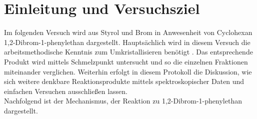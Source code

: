 \section{Einleitung und Versuchsziel}
\label{sec:aufgabenstellung}

Im folgenden Versuch wird aus Styrol und Brom in Anwesenheit von Cyclohexan 1,2-Dibrom-1-phenylethan dargestellt. Hauptsächlich wird in diesem Versuch die arbeitsmethodische Kenntnis zum Umkristallisieren benötigt . Das entsprechende Produkt wird mittels Schmelzpunkt untersucht und so die einzelnen Fraktionen miteinander verglichen. Weiterhin erfolgt in diesem Protokoll die Diskussion, wie sich weitere denkbare Reaktionsprodukte mittels spektroskopischer Daten und einfachen Versuchen ausschließen lassen.\\
Nachfolgend ist der Mechanismus, der Reaktion zu 1,2-Dibrom-1-phenylethan dargestellt.

\bild
